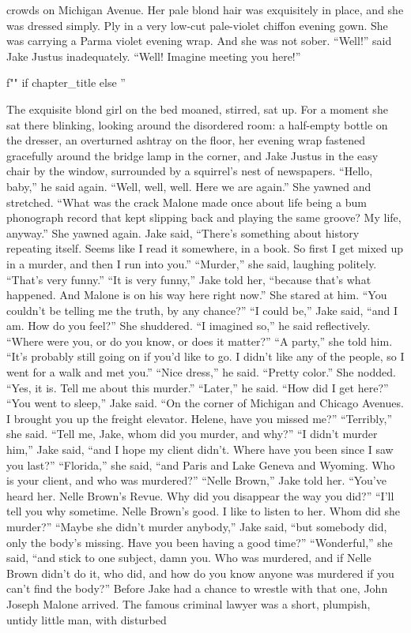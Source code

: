 \documentclass{novel}
\begin{document}
crowds on Michigan Avenue. Her pale blond hair was exquisitely in place, and she was dressed simply. Ply in a very low-cut pale-violet chiffon evening gown. She was carrying a Parma violet evening wrap. And she was not sober. “Well!” said Jake Justus inadequately. “Well! Imagine meeting you here!”

\begin{ChapterStart}
\vspace{3\nbs}
f"" if chapter_title else ''
\end{ChapterStart}

The exquisite blond girl on the bed moaned, stirred, sat up. For a moment she sat there blinking, looking around the disordered room: a half-empty bottle on the dresser, an overturned ashtray on the floor, her evening wrap fastened gracefully around the bridge lamp in the corner, and Jake Justus in the easy chair by the window, surrounded by a squirrel’s nest of newspapers. “Hello, baby,” he said again. “Well, well, well. Here we are again.” She yawned and stretched. “What was the crack Malone made once about life being a bum phonograph record that kept slipping back and playing the same groove? My life, anyway.” She yawned again. Jake said, “There’s something about history repeating itself. Seems like I read it somewhere, in a book. So first I get mixed up in a murder, and then I run into you.” “Murder,” she said, laughing politely. “That’s very funny.” “It is very funny,” Jake told her, “because that’s what happened. And Malone is on his way here right now.” She stared at him. “You couldn’t be telling me the truth, by any chance?” “I could be,” Jake said, “and I am. How do you feel?” She shuddered. “I imagined so,” he said reflectively. “Where were you, or do you know, or does it matter?” “A party,” she told him. “It’s probably still going on if you’d like to go. I didn’t like any of the people, so I went for a walk and met you.” “Nice dress,” he said. “Pretty color.” She nodded. “Yes, it is. Tell me about this murder.” “Later,” he said. “How did I get here?” “You went to sleep,” Jake said. “On the corner of Michigan and Chicago Avenues. I brought you up the freight elevator. Helene, have you missed me?” “Terribly,” she said. “Tell me, Jake, whom did you murder, and why?” “I didn’t murder him,” Jake said, “and I hope my client didn’t. Where have you been since I saw you last?” “Florida,” she said, “and Paris and Lake Geneva and Wyoming. Who is your client, and who was murdered?” “Nelle Brown,” Jake told her. “You’ve heard her. Nelle Brown’s Revue. Why did you disappear the way you did?” “I'll tell you why sometime. Nelle Brown’s good. I like to listen to her. Whom did she murder?” “Maybe she didn’t murder anybody,” Jake said, “but somebody did, only the body’s missing. Have you been having a good time?” “Wonderful,” she said, “and stick to one subject, damn you. Who was murdered, and if Nelle Brown didn’t do it, who did, and how do you know anyone was murdered if you can’t find the body?” Before Jake had a chance to wrestle with that one, John Joseph Malone arrived. The famous criminal lawyer was a short, plumpish, untidy little man, with disturbed 
\end{document}

